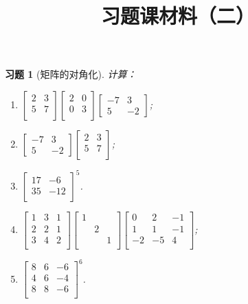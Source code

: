 \documentclass[UTF8]{ctexart}
\newtheorem{ex}[thm]{习题}
\begin{document}
\title{习题课材料（二）}

\date{}

\maketitle

\vspace{-1cm}







\begin{ex}[矩阵的对角化]
	计算：
	\begin{enumerate}
		\item$
		\begin{bmatrix}
		2&3\\5&7\\
		\end{bmatrix}
		\begin{bmatrix}
		2&0\\0&3\\
		\end{bmatrix}
		\begin{bmatrix}
		-7 & 3\\5&-2
		\end{bmatrix}$;
		\item$
		\begin{bmatrix}
		-7 & 3\\5&-2
		\end{bmatrix}
		\begin{bmatrix}
		2&3\\5&7\\
		\end{bmatrix}$;
		\item$
		\begin{bmatrix}
		17&-6\\35&-12\\
		\end{bmatrix}^5$.
		\item$
		\begin{bmatrix}
		1&3&1\\2&2&1\\3&4&2\\
		\end{bmatrix}
		\begin{bmatrix}
		1&&\\&2&\\&&1\\
		\end{bmatrix}
		\begin{bmatrix}
		0&2&-1\\1&1&-1\\-2&-5&4\\
		\end{bmatrix}$;
		\item$
		\begin{bmatrix}
		8&6&-6\\4&6&-4\\8&8&-6\\
		\end{bmatrix}^6$.
	\end{enumerate}
\end{ex}
\end{document}
